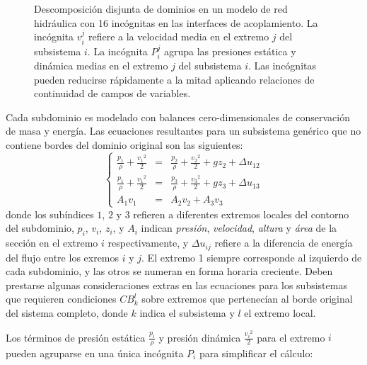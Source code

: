 \begin{figure}[ht]
\caption[Descomposición disjunta de dominios en el modelado de redes hidráulicas]
{Descomposición disjunta de dominios en un modelo de red hidráulica con 16 incógnitas en las interfaces de acoplamiento.
La incógnita $v_{i}^{j}$ refiere a la velocidad media en el extremo $j$ del subsistema $i$.
La incógnita $P_{i}^{j}$ agrupa las presiones estática y dinámica medias en el extremo $j$ del subsistema $i$.
Las incógnitas pueden reducirse rápidamente a la mitad aplicando relaciones de continuidad de campos de variables.}
\label{net16}
\end{figure}

Cada subdominio es modelado con balances cero-dimensionales de conservación de masa y energía.
Las ecuaciones resultantes para un subsistema genérico que no contiene bordes del dominio original son las siguientes:
\begin{equation}
\left \{
\begin{array}{rcl}
\frac{p_1}{\rho} + \frac{{v_1}^2}{2} &=& \frac{p_2}{\rho} + \frac{{v_2}^2}{2} + gz_2 + \Delta u_{12} \\
\frac{p_1}{\rho} + \frac{{v_1}^2}{2} &=& \frac{p_3}{\rho} + \frac{{v_3}^2}{2} + gz_3 + \Delta u_{13} \\
A_1 v_1 &=& A_2 v_2 + A_3 v_3
\end{array}
\right .
\label{net-eq}
\end{equation}
donde los subíndices $1$, $2$ y $3$ refieren a diferentes extremos locales del contorno del subdominio,
$p_i$, $v_i$, $z_i$, y $A_i$ indican \textit{presión}, \textit{velocidad}, \textit{altura} y \textit{área} de la sección en el extremo $i$ respectivamente,
y $\Delta u_{ij}$ refiere a la diferencia de energía del flujo entre los exremos $i$ y $j$.
El extremo 1 siempre corresponde al izquierdo de cada subdominio, y las otros se numeran en forma horaria creciente.
Deben prestarse algunas consideraciones extras en las ecuaciones para los subsistemas que requieren condiciones $CB_{k}^{l}$ sobre extremos que pertenecían al borde original del sistema completo,
donde $k$ indica el subsistema y $l$ el extremo local.

Los términos de presión estática $\frac{p_i}{\rho}$ y presión dinámica $\frac{{v_i}^2}{2}$ para el extremo $i$ pueden agruparse en una única incógnita $P_i$ para simplificar el cálculo:

